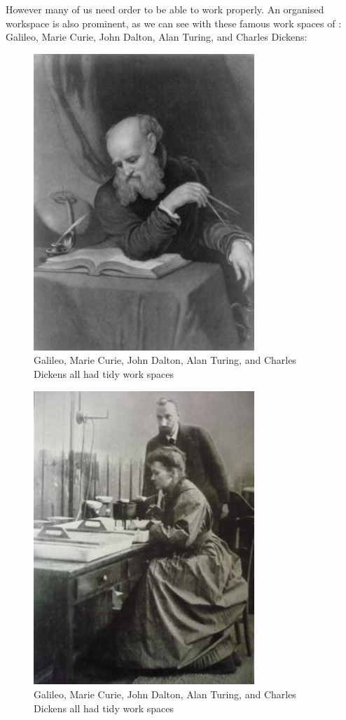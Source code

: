 \documentclass[
]{book}
\begin{document}
However many of us need order to be able to work properly. An organised workspace is also prominent, as we can see with these famous work spaces of : Galileo, Marie Curie, John Dalton, Alan Turing, and Charles Dickens:

\begin{figure}
\includegraphics[width=3.28in]{imgs/galileo_desk} \caption{\label{fig:figs}Galileo, Marie Curie, John Dalton, Alan Turing, and Charles Dickens all had tidy work spaces}\label{fig:unnamed-chunk-3-1}
\end{figure}
\begin{figure}
\includegraphics[width=3.28in]{imgs/marie_curie} \caption{\label{fig:figs}Galileo, Marie Curie, John Dalton, Alan Turing, and Charles Dickens all had tidy work spaces}\label{fig:unnamed-chunk-3-2}
\end{figure}
\end{document}
